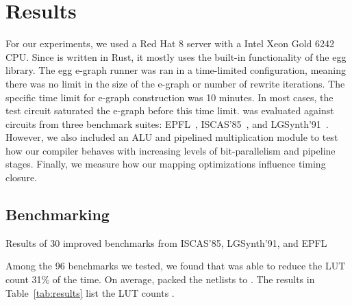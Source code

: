 \section{Results}\label{sec:results}
For our experiments, we used a Red Hat 8 server with a Intel Xeon Gold 6242
CPU. Since \shortname{} is written in Rust, it mostly uses the built-in
functionality of the egg library. The egg e-graph runner was ran in a
time-limited configuration, meaning there was no limit in the size of the
e-graph or number of rewrite iterations. The specific time limit for e-graph
construction was 10 minutes. In most cases, the test circuit saturated the
e-graph before this time limit. \shortname{} was evaluated against circuits
from three benchmark suites: EPFL~\cite{epflbench}, ISCAS'85~\cite{iscasbench},
and LGSynth'91~\cite{lgsynthbench}. However, we also included an ALU and
pipelined multiplication module to test how our compiler behaves with
increasing levels of bit-parallelism and pipeline stages. Finally, we measure
how our mapping optimizations influence timing closure.

\subsection{Benchmarking}\label{sec:results:benchmark}
\begin{table}
    \centering
    \caption{Results of 30 improved benchmarks from ISCAS'85, LGSynth'91, and EPFL}\label{tab:results}
\end{table}
Among the 96 benchmarks we tested, we found that \shortname{} was able to
reduce the LUT count 31\% of the time. On average, \shortname{} packed the
netlists to \metric{}. The results in Table~\ref{tab:results} list the LUT counts .

